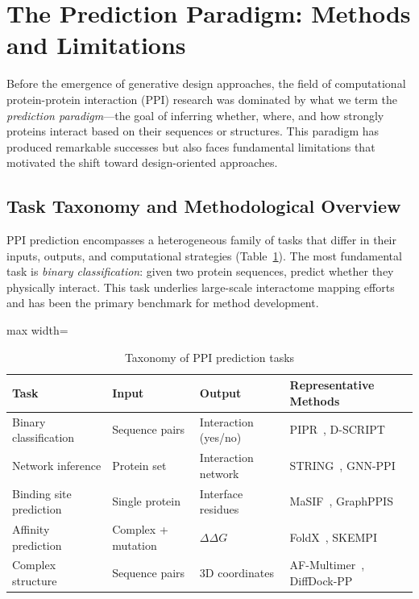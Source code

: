
\section{The Prediction Paradigm: Methods and Limitations}
\label{sec:prediction}

Before the emergence of generative design approaches, the field of computational protein-protein interaction (PPI) research was dominated by what we term the \textit{prediction paradigm}---the goal of inferring whether, where, and how strongly proteins interact based on their sequences or structures. This paradigm has produced remarkable successes but also faces fundamental limitations that motivated the shift toward design-oriented approaches.

\subsection{Task Taxonomy and Methodological Overview}
\label{subsec:tasks}

PPI prediction encompasses a heterogeneous family of tasks that differ in their inputs, outputs, and computational strategies (Table~\ref{tab:ppi_tasks}). The most fundamental task is \textit{binary classification}: given two protein sequences, predict whether they physically interact. This task underlies large-scale interactome mapping efforts and has been the primary benchmark for method development.

\begin{table}[h]
\centering
\caption{Taxonomy of PPI prediction tasks}
\label{tab:ppi_tasks}
\begin{adjustbox}{max width=\textwidth}
\begin{tabular}{@{}llll@{}}
\toprule
\textbf{Task} & \textbf{Input} & \textbf{Output} & \textbf{Representative Methods} \\
\midrule
Binary classification & Sequence pairs & Interaction (yes/no) & PIPR~\cite{chen2019pipr}, D-SCRIPT~\cite{sledzieski2021dscript} \\
Network inference & Protein set & Interaction network & STRING~\cite{szklarczyk2021string}, GNN-PPI~\cite{lv2021gnnppi} \\
Binding site prediction & Single protein & Interface residues & MaSIF~\cite{gainza2020masif}, GraphPPIS~\cite{cao2022graphppis} \\
Affinity prediction & Complex + mutation & $\Delta\Delta G$ & FoldX~\cite{guerois2005foldx}, SKEMPI~\cite{jankauskaite2019skempi2} \\
Complex structure & Sequence pairs & 3D coordinates & AF-Multimer~\cite{evans2022alphafoldmultimer}, DiffDock-PP~\cite{ketata2023diffdockpp} \\
\bottomrule
\end{tabular}
\end{adjustbox}
\end{table}

